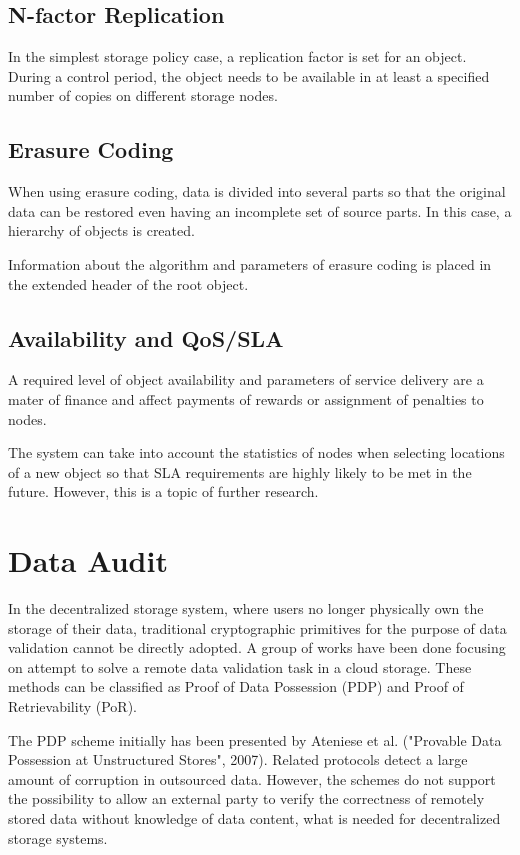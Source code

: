 \documentclass[a4paper, 11pt]{article}
\begin{document}
\subsection{N-factor Replication}

In the simplest storage policy case, a replication factor is set for an
object. During a control period, the object needs to be available in at least
a specified number of copies on different storage nodes.

\subsection{Erasure Coding}

When using erasure coding, data is divided into several parts so that the
original data can be restored even having an incomplete set of source parts. In
this case, a hierarchy of objects is created.

Information about the algorithm and parameters of erasure coding is placed in
the extended header of the root object.

\subsection{Availability and QoS/SLA}

A required level of object availability and parameters of service delivery are
a mater of finance and affect payments of rewards or assignment of penalties to
nodes.

The system can take into account the statistics of nodes when selecting
locations of a new object so that SLA requirements are highly likely to be met
in the future. However, this is a topic of further research.

\section{Data Audit}

In the decentralized storage system, where users no longer physically own the storage of their data, 
traditional cryptographic primitives for the purpose of data validation cannot be directly adopted. 
A group of works have been done focusing on attempt to solve a remote data validation task in a cloud 
storage.  These methods can be classified as Proof of Data Possession (PDP) and Proof of Retrievability (PoR). 

The PDP scheme initially has been presented by Ateniese et al. ("Provable Data Possession at Unstructured Stores", 2007). Related protocols detect a large amount of 
corruption in outsourced data. However, the schemes do not support the possibility to allow an external 
party to verify the correctness of remotely stored data without knowledge of data content, what is 
needed for decentralized storage systems. 
\end{document}
